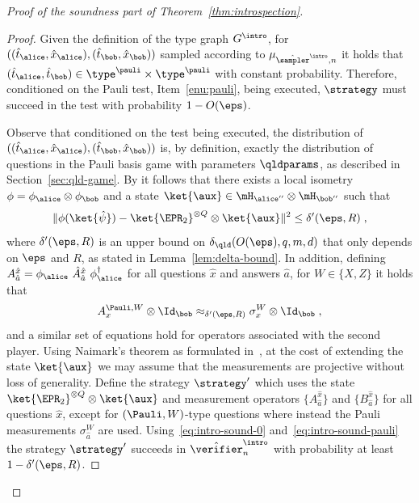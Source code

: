 \begin{proof}[Proof of the soundness part of Theorem~\ref{thm:introspection}]
  \begin{proof}
    Given the definition of the type graph $G^\intro$, for
    $((\hat{t}_\alice,\hat{x}_\alice),(\hat{t}_\bob,\hat{x}_\bob))$ sampled
    according to $\mu_{\tsint,n}$ it holds that
    $(\hat{t}_\alice,\hat{t}_\bob) \in \type^\pauli \times \type^\pauli$ with
    constant probability.
    Therefore, conditioned on the Pauli test, Item~\ref{enu:pauli}, being
    executed, $\strategy$ must succeed in the test with probability $1-O(\eps)$.

    Observe that conditioned on the test being executed, the distribution of
    $((\hat{t}_\alice,\hat{x}_\alice),(\hat{t}_\bob,\hat{x}_\bob))$ is, by
    definition, exactly the distribution of questions in the Pauli basis game
    with parameters $\qldparams$, as described in Section~\ref{sec:qld-game}.
    By  it follows that there exists a local isometry
    $\phi = \phi_\alice \otimes \phi_\bob$ and a state $\ket{\aux}\in
    \mH_{\alice''}\otimes \mH_{\bob''}$ such that
    \begin{equation}\label{eq:intro-sound-0}
      \Vert \phi (\ket{\hat{\psi}}) - \ket{\EPR_2}^{\otimes Q} \otimes
      \ket{\aux} \Vert^2 \leq \delta'(\eps,R)\;,
    \end{equation}
    where $\delta'(\eps,R)$ is an upper bound on $\delta_\qld(O(\eps),q,m,d)$
    that only depends on $\eps$ and $R$, as stated in
    Lemma~\ref{lem:delta-bound}.
    In addition, defining $A^{\hat{x}}_{\hat{a}} = \phi_\alice~
    \hat{A}^{\hat{x}}_{\hat{a}}~\phi_\alice^\dagger$ for all questions $\hat{x}$ and answers
    $\hat{a}$, for $W \in \{X, Z\}$ it holds that
    \begin{equation}
      \label{eq:intro-sound-pauli}
      A^{\Pauli,W}_x \otimes \Id_\bob \approx_{\delta'(\eps,R)}
      \sigma^W_x \otimes \Id_\bob\;,
    \end{equation}
    and a similar set of equations hold for operators associated with the second
    player.
    Using Naimark's theorem as formulated in~\cite[Theorem 5.1]{ML20}, at the
    cost of extending the state $\ket{\aux}$ we may assume that the measurements
    are projective without loss of generality.
    Define the strategy $\strategy'$ which uses the state $\ket{\EPR_2}^{\otimes
      Q} \otimes \ket{\aux}$ and measurement operators $\{ A^{\hat{x}}_{\hat{a}}
    \}$ and $\{ B^{\hat{x}}_{\hat{a}} \}$ for all questions $\hat{x}$, except
    for $(\Pauli,W)$-type questions where instead the Pauli measurements
    $\sigma^W_{\hat{a}}$ are used.
    Using~\eqref{eq:intro-sound-0} and~\eqref{eq:intro-sound-pauli} the strategy
    $\strategy'$ succeeds in $\tvint_n$ with probability at least
    $1-\delta'(\eps,R)$.
	

\end{proof}
\end{proof}

